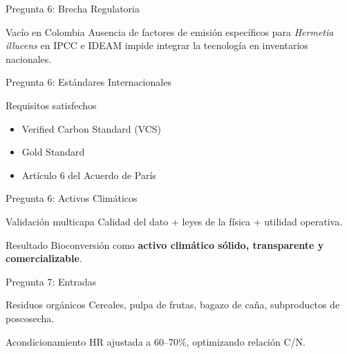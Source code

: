 \documentclass[aspectratio=169, 11pt]{beamer}
\newcommand{\BSF}{\textit{Hermetia illucens}}
\begin{document}
\begin{frame}{Pregunta 6: Brecha Regulatoria}
\begin{alertblock}{Vacío en Colombia}
\footnotesize
Ausencia de factores de emisión específicos para \BSF{} en IPCC e IDEAM impide integrar la tecnología en inventarios nacionales.
\end{alertblock}
\end{frame}

\begin{frame}{Pregunta 6: Estándares Internacionales}
\begin{exampleblock}{Requisitos satisfechos}
\footnotesize
\begin{itemize}
    \item Verified Carbon Standard (VCS)
    \item Gold Standard
    \item Artículo 6 del Acuerdo de París
\end{itemize}
\end{exampleblock}
\end{frame}

\begin{frame}{Pregunta 6: Activos Climáticos}
\begin{block}{Validación multicapa}
\footnotesize
Calidad del dato + leyes de la física + utilidad operativa.
\end{block}
\begin{exampleblock}{Resultado}
\footnotesize
Bioconversión como \textbf{activo climático sólido, transparente y comercializable}.
\end{exampleblock}
\end{frame}

\begin{frame}{Pregunta 7: Entradas}
\begin{block}{Residuos orgánicos}
\footnotesize
Cereales, pulpa de frutas, bagazo de caña, subproductos de poscosecha.
\end{block}
\begin{exampleblock}{Acondicionamiento}
\footnotesize
HR ajustada a 60--70\%, optimizando relación C/N.
\end{exampleblock}
\end{frame}
\end{document}
